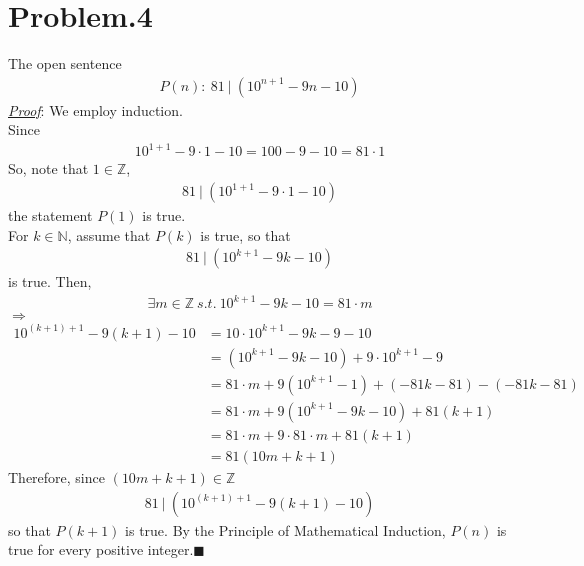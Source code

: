 \documentclass[12pt]{article}
\begin{document}
\section*{Problem.4}
The open sentence
\begin{gather*}
P(n):~ 81~|~\left(10^{n+1} - 9n -10 \right)
\end{gather*}
\underline{\textit{Proof}}: We employ induction.\\[1em]
Since
\begin{gather*}
10^{1+1} - 9 \cdot 1 -10 = 100 - 9 -10 = 81 \cdot 1
\end{gather*}
So, note that $1 \in \mathbb{Z}$,
\begin{gather*}
81~|~\left( 10^{1+1} - 9 \cdot 1 -10 \right)
\end{gather*}
the statement $P(1)$ is true.\\
For $k \in \mathbb{N}$, assume that $P(k)$ is true, so that
\begin{gather*}
81~|~\left(10^{k+1} - 9k -10 \right)
\end{gather*}
is true. Then,
\begin{align*}
\exists m \in \mathbb{Z} ~s.t.~ 10^{k+1} - 9k - 10 = 81 \cdot m
\end{align*}
$\Rightarrow$
\begin{align*}
10^{(k+1)+1} - 9(k+1) -10 &= 10 \cdot 10^{k+1} - 9k - 9 -10\\[1em]
&= \left(10^{k+1} - 9k - 10\right) + 9\cdot 10^{k+1} - 9\\[1em]
&= 81 \cdot m + 9 \left(10^{k+1} - 1\right) + (-81k - 81) - (- 81k - 81)\\[1em]
&= 81 \cdot m + 9 \left(10^{k+1} - 9k - 10\right) + 81(k + 1)\\[1em]
&= 81 \cdot m + 9 \cdot 81 \cdot m + 81(k + 1)\\[1em]
& = 81\left(10  m + k + 1\right)
\end{align*}
Therefore, since $\left(10  m + k + 1 \right) \in \mathbb{Z}$
\begin{align*}
81~|~\left(10^{(k+1)+1} - 9(k+1) -10 \right)
\end{align*}
so that $P(k+1)$ is true. By the Principle of Mathematical Induction, $P(n)$ is true for every positive integer.$\blacksquare$
\end{document}
